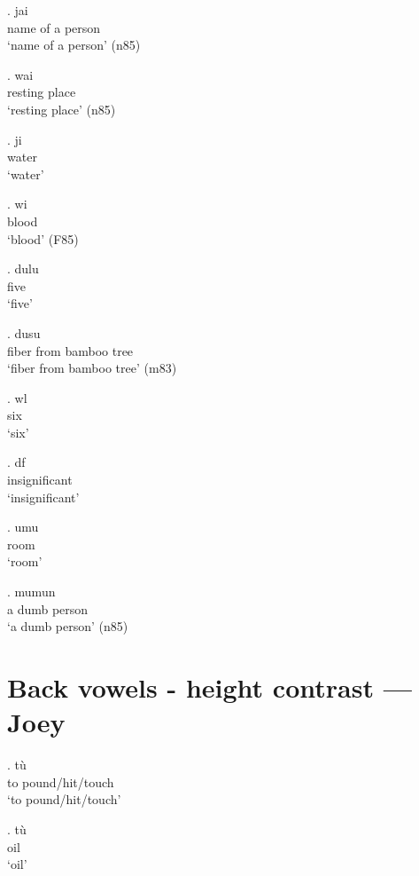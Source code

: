 \documentclass{assets/fieldnotes}
\begin{document}
\exg. jai \\
name of a person\\
`name of a person' (n85)

\exg. wai \\
resting place\\
`resting place' (n85)

\exg. ji \\
water\\
`water'

\exg. wi \\
blood\\
`blood' (F85)




\exg. dulu \\
five\\
`five'

\exg. dusu \\
fiber from bamboo tree\\
`fiber from bamboo tree' (m83)

\exg. wl \\
six\\
`six'

\exg. df \\
insignificant\\
`insignificant'

\exg. umu \\
room\\
`room'

\exg. mumun \\
a dumb person\\
`a dumb person' (n85)

\section{Back vowels - height contrast --- Joey}


\exg. tù \\
to pound/hit/touch\\
`to pound/hit/touch'

\exg. tù \\
oil\\
`oil'
\end{document}
